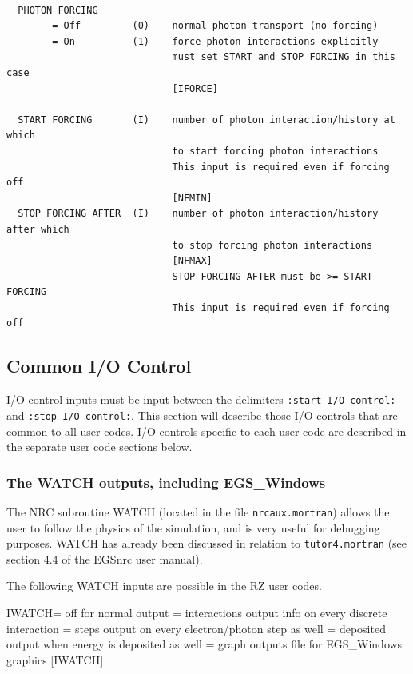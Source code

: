 \documentclass[12pt,twoside]{article}  %
\begin{document}
\begin{verbatim}

  PHOTON FORCING
        = Off         (0)    normal photon transport (no forcing)
        = On          (1)    force photon interactions explicitly
                             must set START and STOP FORCING in this case
                             [IFORCE]

  START FORCING       (I)    number of photon interaction/history at which
                             to start forcing photon interactions
                             This input is required even if forcing off
                             [NFMIN]
  STOP FORCING AFTER  (I)    number of photon interaction/history after which
                             to stop forcing photon interactions
                             [NFMAX]
                             STOP FORCING AFTER must be >= START FORCING
                             This input is required even if forcing off 

\end{verbatim}

\subsection{Common I/O Control}
\label{common_I_O_control}

I/O control inputs must be input between the delimiters
{\tt :start I/O control:} and {\tt :stop I/O control:}.  This section
will describe those I/O controls that are common to all user codes.
I/O controls specific to each user code are described in the separate
user code sections below. 

\subsubsection[WATCH \& EGS\_Windows]{The WATCH outputs, including EGS\_Windows}
\label{watch}

The NRC subroutine WATCH (located in the file \verb+nrcaux.mortran+)
allows the user to follow the physics of the 
simulation, and is very useful for debugging purposes. WATCH
has already been discussed in relation to \verb+tutor4.mortran+
(see section 4.4 of the EGSnrc user manual\cite{KR00}). 

The following WATCH inputs are possible in the RZ user codes.
\begin{center}
\begin{boxedverbatim}

  IWATCH= off            for normal output
        = interactions   output info on every discrete interaction
        = steps          output on every electron/photon step as well
        = deposited      output when energy is deposited as well
        = graph          outputs file for EGS_Windows graphics
                         [IWATCH]

\end{boxedverbatim}
\end{center}
\end{document}
